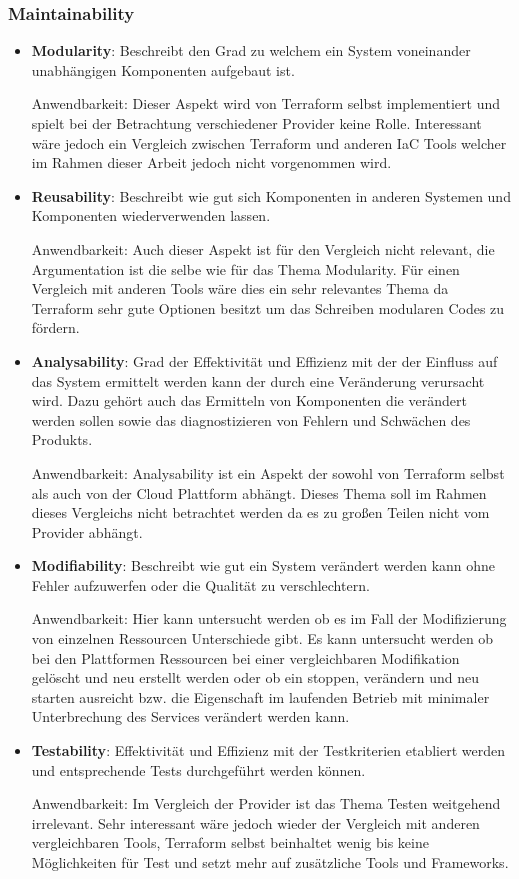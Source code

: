 \subsubsection{Maintainability}

\begin{itemize}
  \item \textbf{Modularity}: Beschreibt den Grad zu welchem ein System 
  voneinander unabhängigen Komponenten aufgebaut ist.

  Anwendbarkeit: Dieser Aspekt wird von Terraform selbst implementiert
  und spielt bei der Betrachtung verschiedener Provider keine Rolle.
  Interessant wäre jedoch ein Vergleich zwischen Terraform und anderen
  IaC Tools welcher im Rahmen dieser Arbeit jedoch nicht vorgenommen wird.

  \item \textbf{Reusability}: Beschreibt wie gut sich Komponenten in
  anderen Systemen und Komponenten wiederverwenden lassen.

  Anwendbarkeit: Auch dieser Aspekt ist für den Vergleich nicht
  relevant, die Argumentation ist die selbe wie für das Thema Modularity.
  Für einen Vergleich mit anderen Tools wäre dies ein sehr relevantes
  Thema da Terraform sehr gute Optionen besitzt um das Schreiben
  modularen Codes zu fördern. 

  \item \textbf{Analysability}: Grad der Effektivität und Effizienz mit
  der der Einfluss auf das System ermittelt werden kann der durch eine
  Veränderung verursacht wird. Dazu gehört auch das Ermitteln von 
  Komponenten die verändert werden sollen sowie das diagnostizieren von
  Fehlern und Schwächen des Produkts.
  
  Anwendbarkeit: Analysability ist ein Aspekt der sowohl
  von Terraform selbst als auch von der Cloud Plattform abhängt. Dieses
  Thema soll im Rahmen dieses Vergleichs nicht betrachtet werden da
  es zu großen Teilen nicht vom Provider abhängt.
  
  \item \textbf{Modifiability}: Beschreibt wie gut ein System verändert
  werden kann ohne Fehler aufzuwerfen oder die Qualität zu verschlechtern.

  Anwendbarkeit: Hier kann untersucht werden ob es im Fall der
  Modifizierung von einzelnen Ressourcen Unterschiede gibt. Es kann
  untersucht werden ob bei den Plattformen Ressourcen bei einer
  vergleichbaren Modifikation gelöscht und neu erstellt werden oder
  ob ein stoppen, verändern und neu starten ausreicht bzw. die
  Eigenschaft im laufenden Betrieb mit minimaler Unterbrechung des
  Services verändert werden kann. 
  
  \item \textbf{Testability}: Effektivität und Effizienz mit der
  Testkriterien etabliert werden und entsprechende Tests durchgeführt
  werden können.

  Anwendbarkeit: Im Vergleich der Provider ist das Thema Testen
  weitgehend irrelevant. Sehr interessant wäre jedoch wieder der Vergleich
  mit anderen vergleichbaren Tools, Terraform selbst beinhaltet
  wenig bis keine Möglichkeiten für Test und setzt mehr auf zusätzliche
  Tools und Frameworks.
\end{itemize}

